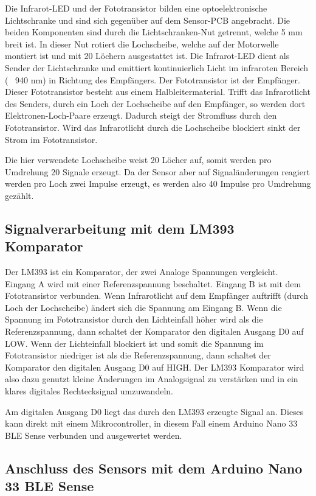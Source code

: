 Die Infrarot-LED und der Fototransistor bilden eine optoelektronische Lichtschranke und sind sich gegenüber auf dem Sensor-PCB angebracht. Die beiden Komponenten sind durch die Lichtschranken-Nut getrennt, welche 5 mm breit ist. In dieser Nut rotiert die Lochscheibe, welche auf der Motorwelle montiert ist und mit 20 Löchern ausgestattet ist. Die Infrarot-LED dient als Sender der Lichtschranke und emittiert kontinuierlich Licht im infraroten Bereich (~ 940 nm) in Richtung des Empfängers. Der Fototransistor ist der Empfänger. Dieser Fototransistor besteht aus einem Halbleitermaterial. Trifft das Infrarotlicht des Senders, durch ein Loch der Lochscheibe auf den Empfänger, so werden dort Elektronen-Loch-Paare erzeugt. Dadurch steigt der Stromfluss durch den Fototransistor. Wird das Infrarotlicht durch die Lochscheibe blockiert sinkt der Strom im Fototransistor. 

Die hier verwendete Lochscheibe weist 20 Löcher auf, somit werden pro Umdrehung 20 Signale erzeugt. Da der Sensor aber auf Signaländerungen reagiert werden pro Loch zwei Impulse erzeugt, es werden also 40 Impulse pro Umdrehung gezählt. \cite{Parthier}

\subsection{Signalverarbeitung mit dem LM393 Komparator}

Der LM393 ist ein Komparator, der zwei Analoge Spannungen vergleicht. Eingang A wird mit einer Referenzspannung beschaltet. Eingang B ist mit dem Fototransistor verbunden. Wenn Infrarotlicht auf dem Empfänger auftrifft (durch Loch der Lochscheibe) ändert sich die Spannung am Eingang B. Wenn die Spannung im Fototransistor durch den Lichteinfall höher wird als die Referenzspannung, dann schaltet der Komparator den digitalen Ausgang D0 auf LOW. Wenn der Lichteinfall blockiert ist und somit die Spannung im Fototransistor niedriger ist als die Referenzspannung, dann schaltet der Komparator den digitalen Ausgang D0 auf HIGH. Der LM393 Komparator wird also dazu genutzt kleine Änderungen im Analogsignal zu verstärken und in ein klares digitales Rechtecksignal umzuwandeln.

Am digitalen Ausgang D0 liegt das durch den LM393 erzeugte Signal an. Dieses kann direkt mit einem Mikrocontroller, in diesem Fall einem Arduino Nano 33 BLE Sense verbunden und ausgewertet werden. \cite{Parthier}

\subsection{Anschluss des Sensors mit dem Arduino Nano 33 BLE Sense}

